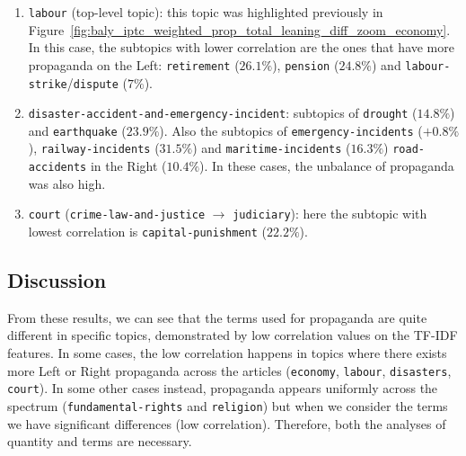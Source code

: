 \begin{enumerate}
    \item \texttt{labour} (top-level topic): this topic was highlighted previously in Figure~\ref{fig:baly_iptc_weighted_prop_total_leaning_diff_zoom_economy}. In this case, the subtopics with lower correlation are the ones that have more propaganda on the Left:  \texttt{retirement} ($26.1\%$), \texttt{pension} ($24.8\%$) and \texttt{labour-strike}/\texttt{dispute} ($7\%$).
    \item \texttt{disaster-accident-and-emergency-incident}: subtopics of \texttt{drought} ($14.8\%$) and \texttt{earthquake} ($23.9\%$). Also the subtopics of \texttt{emergency-incidents} ($+0.8\%$), \texttt{railway-incidents} ($31.5\%$) and \texttt{maritime-incidents} ($16.3\%$) \texttt{road-accidents} in the Right ($10.4\%$). In these cases, the unbalance of propaganda was also high.
    \item \texttt{court} (\texttt{crime-law-and-justice} $\rightarrow$ \texttt{judiciary}): here the subtopic with lowest correlation is \texttt{capital-punishment} ($22.2\%$).
\end{enumerate}

\subsection{\statusgreen Discussion}

From these results, we can see that the terms used for propaganda are quite different in specific topics, demonstrated by low correlation values on the TF-IDF features.
In some cases, the low correlation happens in topics where there exists more Left or Right propaganda across the articles (\texttt{economy}, \texttt{labour}, \texttt{disasters}, \texttt{court}). In some other cases instead, propaganda appears uniformly across the spectrum (\texttt{fundamental-rights} and \texttt{religion}) but when we consider the terms we have significant differences (low correlation). Therefore, both the analyses of quantity and terms are necessary.





